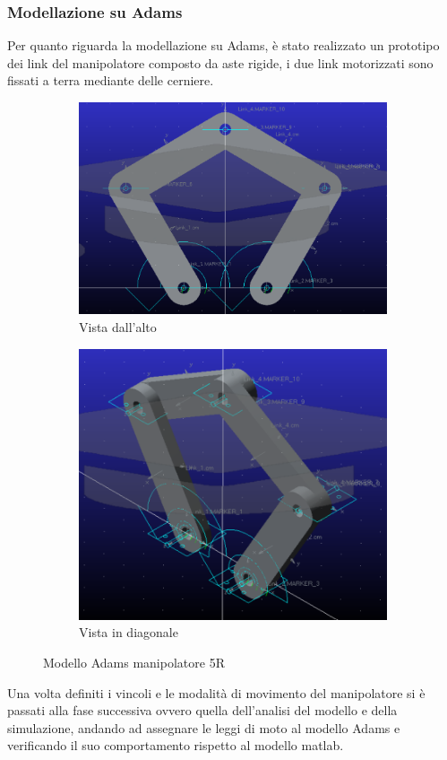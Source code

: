 \subsubsection*{Modellazione su Adams}
Per quanto riguarda la modellazione su Adams, è stato realizzato un prototipo dei link del manipolatore composto da aste rigide, i due link motorizzati sono fissati a terra mediante delle cerniere.
\begin{figure}[!ht]
	\begin{subfigure}{.5\textwidth}
		\centering
		\includegraphics[width=.9\linewidth]{Immagini/Dinamica/adams1.png}  
		\caption{Vista dall'alto}
		\label{fig:sub-adams1}
	\end{subfigure}
	\begin{subfigure}{.5\textwidth}
		\centering
		\includegraphics[width=.8\linewidth]{Immagini/Dinamica/adams2.png}  
		\caption{Vista in diagonale}
		\label{fig:sub-adams2}
	\end{subfigure}
	\caption{Modello Adams manipolatore 5R}
\end{figure}
Una volta definiti i vincoli e le modalità di movimento del manipolatore si è passati alla fase successiva ovvero quella dell'analisi del modello e della simulazione, andando ad assegnare le leggi di moto al modello Adams e verificando il suo comportamento rispetto al modello matlab.

